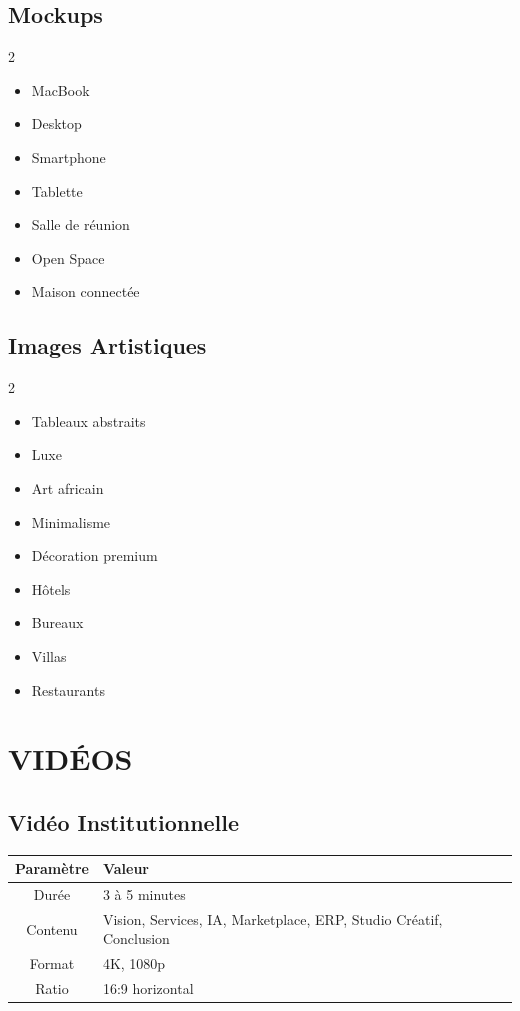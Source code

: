 \documentclass[12pt,a4paper,oneside]{book}
\begin{document}
\section{Mockups}
\begin{multicols}{2}
\begin{itemize}
\item MacBook
\item Desktop
\item Smartphone
\item Tablette
\item Salle de réunion
\item Open Space
\item Maison connectée
\end{itemize}
\end{multicols}

\section{Images Artistiques}
\begin{multicols}{2}
\begin{itemize}
\item Tableaux abstraits
\item Luxe
\item Art africain
\item Minimalisme
\item Décoration premium
\item Hôtels
\item Bureaux
\item Villas
\item Restaurants
\end{itemize}
\end{multicols}

\chapter{VIDÉOS}

\section{Vidéo Institutionnelle}
\bigskip
\begin{center}
\begin{tabular}{|c|p{10cm}|}
\hline
\rowcolor{bleuIA}
\color{white}\textbf{Paramètre} & \color{white}\textbf{Valeur} \\
\hline
Durée & 3 à 5 minutes \\
\hline
Contenu & Vision, Services, IA, Marketplace, ERP, Studio Créatif, Conclusion \\
\hline
Format & 4K, 1080p \\
\hline
Ratio & 16:9 horizontal \\
\hline
\end{tabular}
\end{center}
\end{document}
